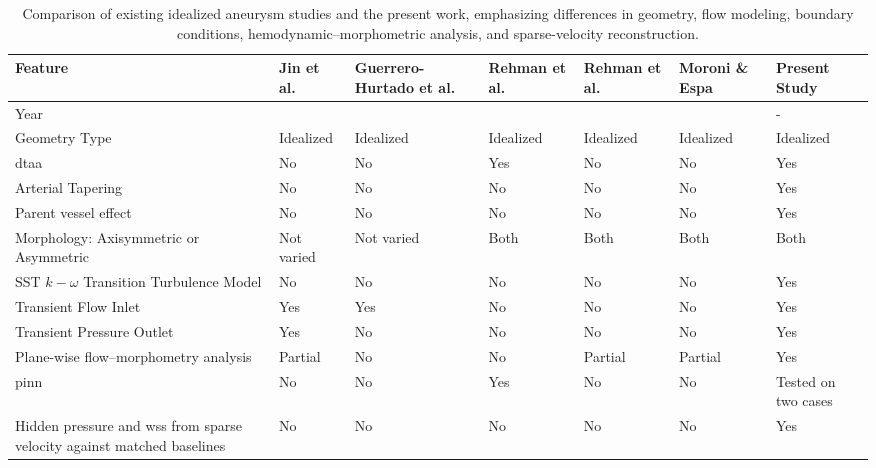 \documentclass[12pt,a4paper]{article}
\newcommand{\DTAA}{\ac{dtaa}\xspace}
\newcommand{\WSS}{\ac{wss}\xspace}
\newcommand{\PINNcap}{\Ac{pinn}\xspace}
\theoremstyle{definition}
\numberwithin{equation}{section}
\begin{document}
\begin{table}[htbp]
\centering
\footnotesize
\caption{Comparison of existing idealized aneurysm studies and the present work, emphasizing differences in geometry, flow modeling, boundary conditions, hemodynamic--morphometric analysis, and sparse-velocity reconstruction.}
\setlength{\tabcolsep}{3pt}
\begin{tabular}{|>{\raggedright\arraybackslash}p{4.0cm}|*{6}{>{\centering\arraybackslash}p{1.78cm}|}}
\hline
\textbf{Feature} & \parbox{1.78cm}{\textbf{Jin et al.~\cite{jin2021arterial}}} & \parbox{1.78cm}{\textbf{Guerrero-Hurtado et al.~\cite{guerrero2023efficient}}} & \parbox{1.78cm}{\textbf{Rehman et al.~\cite{rehman2024comparative}}} & \parbox{1.78cm}{\textbf{Rehman et al.~\cite{rehman2025application}}} & \parbox{1.78cm}{\textbf{Moroni \& Espa~\cite{moroni2025insight}}} & \parbox{1.78cm}{\textbf{Present Study}} \\
\hline
Year & 2021 & 2023 & 2024 & 2025 & 2025 & - \\
\hline
Geometry Type & Idealized & Idealized & Idealized & Idealized & Idealized & Idealized \\
\hline
\DTAA & No & No & Yes & No & No & Yes \\
\hline
{Arterial Tapering} & No & No & No & No & No & Yes \\
\hline
Parent vessel effect & No & No & No & No & No & Yes \\
\hline
\parbox{3.7cm}{Morphology: Axisymmetric or Asymmetric} & Not varied & Not varied & Both & Both & Both & Both \\
\hline
\parbox{3.7cm}{SST $k-\omega$ Transition Turbulence Model} & No & No & No & No & No & Yes \\
\hline
Transient Flow Inlet & Yes & Yes & No & No & No & Yes \\
\hline
\parbox{3cm}{Transient Pressure Outlet} & Yes & No & No & No & No & Yes \\
\hline
Plane-wise flow--morphometry analysis & Partial & No & No & Partial & Partial & Yes \\
\hline
\PINNcap & No & No & Yes & No & No & Tested on two cases \\
\hline
Hidden pressure and \WSS from sparse velocity against matched baselines & No & No & No & No & No & Yes \\
\hline
\end{tabular}%
\label{tab:lit_review}
\end{table}
\end{document}
